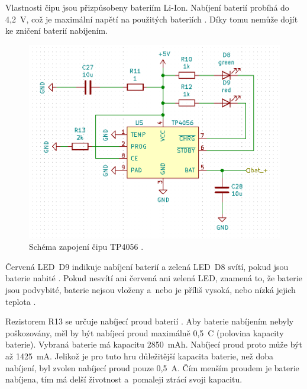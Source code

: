   Vlastnosti čipu jsou přizpůsobeny bateriím Li-Ion. Nabíjení baterií probíhá do 4,2~V, což je maximální napětí na použitých 
  bateriích \cite{18650} \cite{TP4056_datasheet}. Díky tomu nemůže dojít ke zničení baterií nabíjením.

  \begin{figure}[!h]
    \begin{center}
      \includegraphics[scale=0.6]{obrazky/TP4056_schema.png}
    \end{center}
    \caption[Schéma zapojení čipu TP4056 \cite{TP4056_datasheet}]{Schéma zapojení čipu TP4056 \cite{TP4056_datasheet}.}
  \end{figure}

  Červená LED~D9 indikuje nabíjení baterií a  zelená LED~D8 svítí, pokud jsou baterie nabité \cite{TP4056_datasheet}. 
  Pokud nesvítí ani červená ani zelená LED, znamená to, že baterie jsou podvybité, baterie nejsou vloženy a~nebo je příliš vysoká, 
  nebo nízká jejich teplota \cite{TP4056_datasheet}.

  Rezistorem R13 se určuje nabíjecí proud baterií \cite{TP4056_datasheet}. Aby baterie nabíjením nebyly poškozovány, měl by být nabíjecí 
  proud maximálně 0,5~C (polovina kapacity baterie). Vybraná baterie má kapacitu 2850~mAh. Nabíjecí proud proto může být až 1425~mA. 
  Jelikož je pro tuto hru důležitější kapacita baterie, než doba nabíjení, byl zvolen nabíjecí proud pouze 0,5~A. Čím menším proudem 
  je baterie nabíjena, tím má delší životnost a~pomaleji ztrácí svoji kapacitu.

